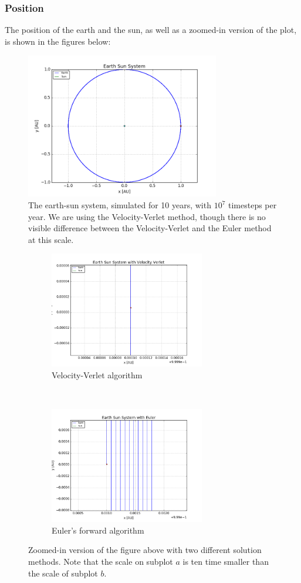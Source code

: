 \documentclass[a4paper, 10pt]{article}
\begin{document}
\subsubsection{Position}
The position of the earth and the sun, as well as a zoomed-in version of the plot, is shown in the figures below:
\begin{figure}[t!]
    \centering
    \includegraphics[height=2.5in]{earthsun.png}
    \caption{The earth-sun system, simulated for 10 years, with $10^7$ timesteps per year. We are using the Velocity-Verlet method, though there is no visible difference between the Velocity-Verlet and the Euler method at this scale.} \label{fig:earth-sun-figure1}
\end{figure}


\begin{figure}[t!]
    \centering
    \begin{subfigure}[t]{0.5\textwidth}
        \centering
        \includegraphics[height=2.0in]{orbitESVV.png}
        \caption{Velocity-Verlet algorithm}
    \end{subfigure}%
    ~ 
    \begin{subfigure}[t]{0.5\textwidth}
        \centering
        \includegraphics[height=2.0in]{orbitESEuler.png}
        \caption{Euler's forward algorithm}
    \end{subfigure}
    \caption{Zoomed-in version of the figure above with two different solution methods. Note that the scale on subplot $a$ is ten time smaller than the scale of subplot $b$.}
\end{figure}
\end{document}
